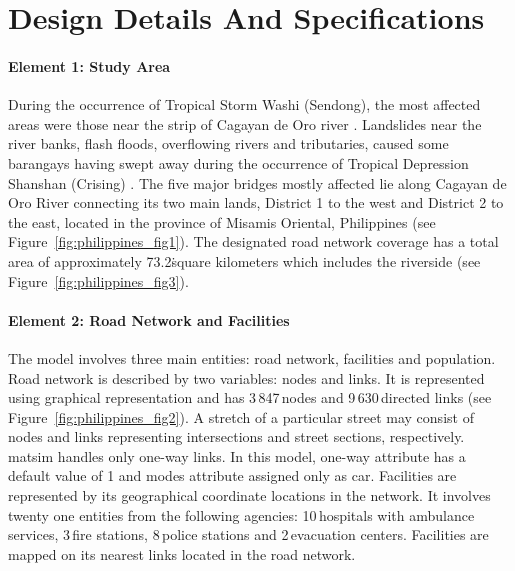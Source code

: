 \section{Design Details And Specifications}
\paragraph{Element 1: Study Area}
During the occurrence of Tropical Storm Washi (Sendong), the most affected areas were those near the strip of Cagayan de Oro river \citep[][]{Ramos_TechRep_NDRRMC_2011}. Landslides near the river banks, flash floods, overflowing rivers and tributaries, caused some barangays having swept away during the occurrence of Tropical Depression Shanshan (Crising) \citep[][]{Delrosario_TechRep_NDRRMC_2011}. The five major bridges mostly affected lie along Cagayan de Oro River connecting its two main lands, District 1 to the west and District 2 to the east, located in the province of Misamis Oriental, Philippines (see Figure~\ref{fig:philippines_fig1}). The designated road network coverage has a total area of approximately 73.2\.square kilometers which includes the riverside (see Figure~\ref{fig:philippines_fig3}). 

\paragraph{Element 2: Road Network and Facilities}
The model involves three main entities: road network, facilities and population. Road network is described by two variables: nodes and links. It is represented using graphical representation and has 3\,847\,nodes and 9\,630\,directed links (see Figure~\ref{fig:philippines_fig2}). A stretch of a particular street may consist of nodes and links representing intersections and street sections, respectively. \gls{matsim} handles only one-way links. In this model, one-way attribute has a default value of 1 and modes attribute assigned only as car. Facilities are represented by its geographical coordinate locations in the network. It involves twenty one entities from the following agencies: 10\,hospitals with ambulance services, 3\,fire stations, 8\,police stations and 2\,evacuation centers. Facilities are mapped on its nearest links located in the road network.

